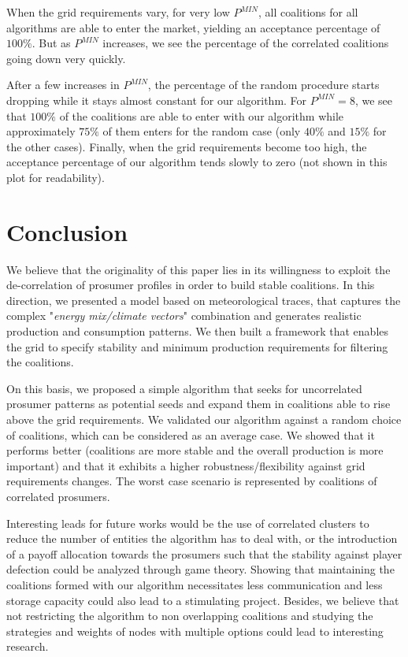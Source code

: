 \documentclass[conference]{IEEEtran}
\begin{document}
\begin{minipage}{\textwidth}
\begin{multicols}{2}
When the grid requirements vary, for very low $ P^{MIN} $, all coalitions for all algorithms are able to enter the market, yielding an acceptance percentage of $ 100 \% $. But as $ P^{MIN} $ increases, we see the percentage of the correlated coalitions going down very quickly. 

After a few increases in $ P^{MIN} $, the percentage of the random procedure starts dropping while it stays almost constant for our algorithm. For $ P^{MIN} = 8 $, we see that $ 100 \% $ of the coalitions are able to enter with our algorithm while approximately $ 75 \%$ of them enters for the random case (only $40 \%$ and $15 \%$ for the other cases). Finally, when the grid requirements become too high, the acceptance percentage of our algorithm tends slowly to zero (not shown in this plot for readability).

%
%
\section{Conclusion}
\label{sec:conclusion}

We believe that the originality of this paper lies in its willingness to exploit the de-correlation of prosumer profiles in order to build stable coalitions. In this direction, we presented a model based on meteorological traces, that captures the complex "\textit{energy mix/climate vectors}" combination and generates realistic production and consumption patterns. We then built a framework that enables the grid to specify stability and minimum production requirements for filtering the coalitions. 

On this basis, we proposed a simple algorithm that seeks for uncorrelated prosumer patterns as potential seeds and expand them in coalitions able to rise above the grid requirements. We validated our algorithm against a random choice of coalitions, which can be considered as an average case. We showed  that it performs better (coalitions are more stable and the overall production is more important) and that it exhibits a higher robustness/flexibility against grid requirements changes. The worst case scenario is represented by coalitions of correlated prosumers. 

Interesting leads for future works would be the use of correlated clusters to reduce the number of entities the algorithm has to deal with, or the introduction of a payoff allocation towards the prosumers such that the stability against player defection could be analyzed through game theory. Showing that maintaining the coalitions formed with our algorithm necessitates less communication and less storage capacity could also lead to a stimulating project. Besides, we believe that not restricting the algorithm to non overlapping coalitions and studying the strategies and weights of nodes with multiple options could lead to interesting research.


\end{multicols}
\end{minipage}
\end{document}
